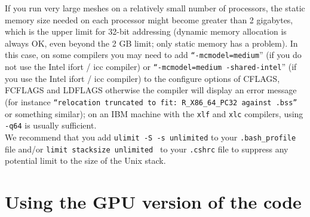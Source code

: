 If you run very large meshes on a relatively small number
of processors, the static memory size needed on each processor might become
greater than 2 gigabytes, which is the upper limit for 32-bit addressing
(dynamic memory allocation is always OK, even beyond the 2 GB limit; only static memory has a problem).
In this case, on some compilers you may need to add \texttt{``-mcmodel=medium}'' (if you do not use the Intel ifort / icc compiler)
or \texttt{``-mcmodel=medium -shared-intel}'' (if you use the Intel ifort / icc compiler)
to the configure options of CFLAGS, FCFLAGS and LDFLAGS otherwise the compiler will display an error
message (for instance \texttt{``relocation truncated to fit: R\_X86\_64\_PC32 against .bss''} or something similar);
on an IBM machine with the \texttt{xlf} and \texttt{xlc} compilers, using \texttt{-q64} is usually sufficient.\\

We recommend that you add {\texttt{ulimit -S -s unlimited}} to your {\texttt{.bash\_profile}} file and/or {\texttt{limit stacksize unlimited }} to your {\texttt{.cshrc}} file to suppress any potential limit to the size of the Unix stack.\\


\section{Using the GPU version of the code}

